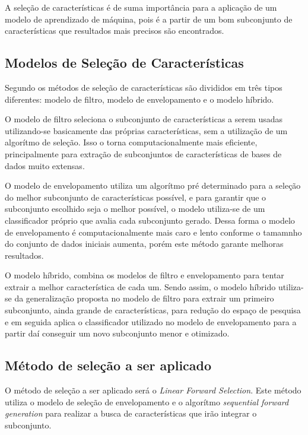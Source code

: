     A seleção de características é de suma importância para a aplicação de um modelo de aprendizado de máquina, pois é a partir de um bom subconjunto de características que resultados mais precisos são encontrados.

    \subsection{Modelos de Seleção de Características}
        Segundo \cite{Yu2005} os métodos de seleção de características são divididos em três tipos diferentes: modelo de filtro, modelo de envelopamento e o modelo híbrido.

        O modelo de filtro seleciona o subconjunto de características a serem usadas utilizando-se basicamente das próprias características, sem a utilização de um algorítmo de seleção. Isso o torna computacionalmente mais eficiente, principalmente para extração de subconjuntos de características de bases de dados muito extensas.

        O modelo de envelopamento utiliza um algorítmo pré determinado para a seleção do melhor subconjunto de características possível, e para garantir que o subconjunto escolhido seja o melhor possível, o modelo utiliza-se de um classificador próprio que avalia cada subconjunto gerado. Dessa forma o modelo de envelopamento é computacionalmente mais caro e lento conforme o tamamnho do conjunto de dados iniciais aumenta, porém este método garante melhoras resultados.

        O modelo híbrido, combina os modelos de filtro e envelopamento para tentar extrair a melhor característica de cada um. Sendo assim, o modelo híbrido utiliza-se da generalização proposta no modelo de filtro para extrair um primeiro subconjunto, ainda grande de características, para redução do espaço de pesquisa e em seguida aplica o classificador utilizado no modelo de envelopamento para a partir daí conseguir um novo subconjunto menor e otimizado. \cite{Sutha2015}

    \subsection{Método de seleção a ser aplicado}

        O método de seleção a ser aplicado será o \textit{Linear Forward Selection}. Este método utiliza o modelo de seleção de envelopamento e o algorítmo \textit{sequential forward generation} para realizar a busca de características que irão integrar o subconjunto.


